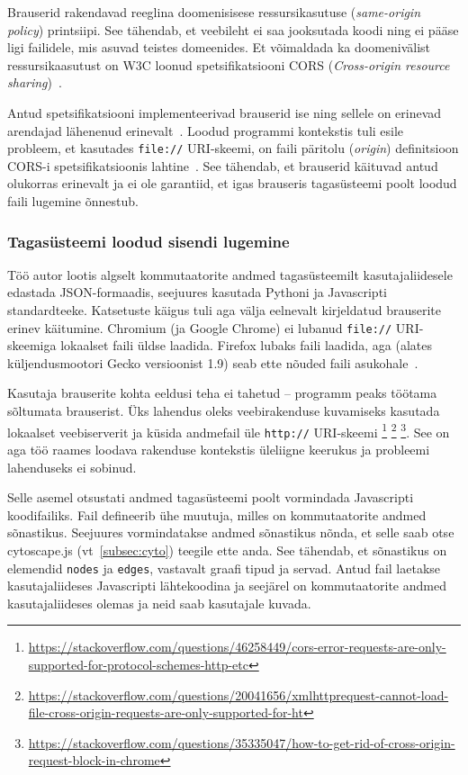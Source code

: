 \documentclass[12pt]{article}
\begin{document}
Brauserid rakendavad reeglina doomenisisese ressursikasutuse (\textit{same-origin policy})
printsiipi.
See tähendab, et veebileht ei saa jooksutada koodi ning ei pääse ligi failidele, mis asuvad
teistes domeenides.
Et võimaldada ka doomenivälist ressursikaasutust on W3C loonud spetsifikatsiooni CORS
(\textit{Cross-origin resource sharing})~\cite{W3CORS}.


Antud spetsifikatsiooni implementeerivad brauserid ise ning sellele on erinevad arendajad
lähenenud erinevalt~\cite{localWebSec}.
Loodud programmi kontekstis tuli esile probleem, et kasutades \texttt{file://} URI-skeemi, on faili
päritolu (\textit{origin}) definitsioon CORS-i spetsifikatsioonis
lahtine~\cite[peatükk 4, punkt 4]{ietfOrigin}.
See tähendab, et brauserid käituvad antud olukorras erinevalt ja ei ole garantiid, et igas
brauseris tagasüsteemi poolt loodud faili lugemine õnnestub.

\subsubsection{Tagasüsteemi loodud sisendi lugemine} \label{dataInput}
Töö autor lootis algselt kommutaatorite andmed tagasüsteemilt kasutajaliidesele edastada
JSON-formaadis, seejuures kasutada Pythoni ja Javascripti standardteeke.
Katsetuste käigus tuli aga välja eelnevalt kirjeldatud brauserite erinev käitumine.
Chromium (ja Google Chrome) ei lubanud \texttt{file://} URI-skeemiga lokaalset faili üldse laadida.
Firefox lubaks faili laadida, aga (alates küljendusmootori Gecko versioonist 1.9) seab ette nõuded
faili asukohale~\cite{FFCORS}.

Kasutaja brauserite kohta eeldusi teha ei tahetud -- programm peaks töötama sõltumata brauserist.
Üks lahendus oleks veebirakenduse kuvamiseks kasutada lokaalset veebiserverit ja küsida andmefail
üle \texttt{http://} URI-skeemi
\footnote{\url{https://stackoverflow.com/questions/46258449/cors-error-requests-are-only-supported-for-protocol-schemes-http-etc}}
\footnote{\url{https://stackoverflow.com/questions/20041656/xmlhttprequest-cannot-load-file-cross-origin-requests-are-only-supported-for-ht}}
\footnote{\url{https://stackoverflow.com/questions/35335047/how-to-get-rid-of-cross-origin-request-block-in-chrome}}.
See on aga töö raames loodava rakenduse kontekstis üleliigne keerukus ja probleemi lahenduseks ei
sobinud.

Selle asemel otsustati andmed tagasüsteemi poolt vormindada Javascripti koodifailiks.
Fail defineerib ühe muutuja, milles on kommutaatorite andmed sõnastikus.
Seejuures vormindatakse andmed sõnastikus nõnda, et selle saab otse cytoscape.js
(vt~\ref{subsec:cyto}) teegile ette anda.
See tähendab, et sõnastikus on elemendid \texttt{nodes} ja \texttt{edges}, vastavalt graafi tipud
ja servad.
Antud fail laetakse kasutajaliideses Javascripti lähtekoodina ja seejärel on kommutaatorite
andmed kasutajaliideses olemas ja neid saab kasutajale kuvada.
\end{document}
